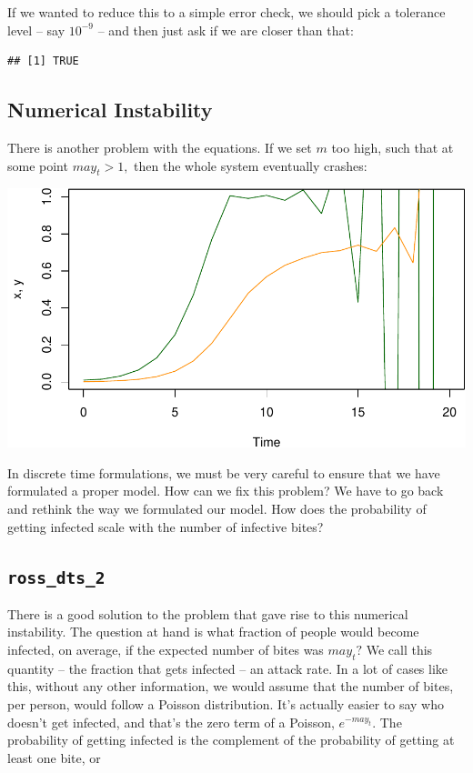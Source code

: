 \documentclass[
]{book}
\begin{document}
If we wanted to reduce this to a simple error check, we should pick a tolerance level -- say \(10^{-9}\) -- and then just ask if we are closer than that:

\begin{verbatim}
## [1] TRUE
\end{verbatim}

\subsection{Numerical Instability}\label{numerical-instability}

There is another problem with the equations. If we set \(m\) too high, such that at some point \(m a y_t > 1,\) then the whole system eventually crashes:

\includegraphics{docs/figs/unnamed-chunk-26-1.pdf}

In discrete time formulations, we must be very careful to ensure that we have formulated a proper model. How can we fix this problem? We have to go back and rethink the way we formulated our model. How does the probability of getting infected scale with the number of infective bites?

\subsection{\texorpdfstring{\texttt{ross\_dts\_2}}{ross\_dts\_2}}\label{dtsRoss2}

There is a good solution to the problem that gave rise to this numerical instability. The question at hand is what fraction of people would become infected, on average, if the expected number of bites was \(may_t?\) We call this quantity -- the fraction that gets infected -- an attack rate. In a lot of cases like this, without any other information, we would assume that the number of bites, per person, would follow a Poisson distribution. It's actually easier to say who doesn't get infected, and that's the zero term of a Poisson, \(e^{-may_t}.\) The probability of getting infected is the complement of the probability of getting at least one bite, or
\end{document}
